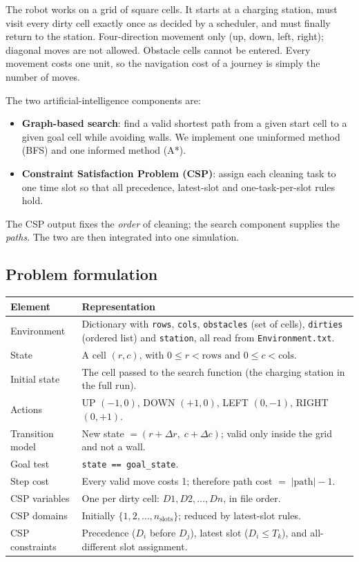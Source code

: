 \documentclass[11pt,a4paper]{article}
\newcommand{\code}[1]{\texttt{#1}}
\begin{document}
The robot works on a grid of square cells. It starts at a charging station, must visit every
dirty cell exactly once as decided by a scheduler, and must finally return to the station.
Four-direction movement only (up, down, left, right); diagonal moves are not allowed.
Obstacle cells cannot be entered. Every movement costs one unit, so the navigation cost of a
journey is simply the number of moves.

The two artificial-intelligence components are:

\begin{itemize}[leftmargin=1.2cm]
  \item \textbf{Graph-based search}: find a valid shortest path from a given start cell to a
        given goal cell while avoiding walls. We implement one uninformed method (BFS) and one
        informed method (A*).
  \item \textbf{Constraint Satisfaction Problem (CSP)}: assign each cleaning task to one time
        slot so that all precedence, latest-slot and one-task-per-slot rules hold.
\end{itemize}

The CSP output fixes the \emph{order} of cleaning; the search component supplies the
\emph{paths}. The two are then integrated into one simulation.

\subsection{Problem formulation}

\begin{center}
\begin{tabular}{@{}p{3.4cm}p{12.3cm}@{}}
\toprule
Element & Representation \\
\midrule
Environment & Dictionary with \code{rows}, \code{cols}, \code{obstacles} (set of cells),
              \code{dirties} (ordered list) and \code{station}, all read from \code{Environment.txt}. \\
State & A cell $(r,c)$, with $0\le r<\text{rows}$ and $0\le c<\text{cols}$. \\
Initial state & The cell passed to the search function (the charging station in the full run). \\
Actions & UP $(-1,0)$, DOWN $(+1,0)$, LEFT $(0,-1)$, RIGHT $(0,+1)$. \\
Transition model & New state $= (r+\Delta r,\; c+\Delta c)$; valid only inside the grid and not a wall. \\
Goal test & \code{state == goal\_state}. \\
Step cost & Every valid move costs 1; therefore path cost $=\;|\text{path}|-1$. \\
CSP variables & One per dirty cell: $D1,D2,\dots,Dn$, in file order. \\
CSP domains & Initially $\{1,2,\dots,n_{\text{slots}}\}$; reduced by latest-slot rules. \\
CSP constraints & Precedence ($D_i$ before $D_j$), latest slot ($D_i\le T_k$),
                  and all-different slot assignment. \\
\bottomrule
\end{tabular}
\end{center}
\end{document}

